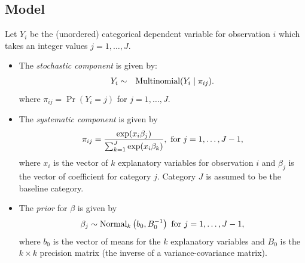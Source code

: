 \documentclass[letterpaper,10pt,english]{sphinxmanual}
\begin{document}
\subsection{Model}
\label{vignette:id86}
Let \(Y_{i}\) be the (unordered) categorical dependent variable for
observation \(i\) which takes an integer values
\(j=1, \ldots, J\).
\begin{itemize}
\item {} 
The \emph{stochastic component} is given by:
\begin{gather}
\begin{split}\begin{aligned}
Y_{i} &\sim& \textrm{Multinomial}(Y_i \mid \pi_{ij}).\end{aligned}\end{split}\notag
\end{gather}
where \(\pi_{ij}=\Pr(Y_i=j)\) for \(j=1, \ldots, J\).

\item {} 
The \emph{systematic component} is given by
\begin{gather}
\begin{split}\begin{aligned}
\pi_{ij}=\frac{\exp(x_i\beta_j)}{\sum_{k=1}^J \exp(x_i\beta_k)},
\textrm{ for } j=1,\ldots, J-1,\end{aligned}\end{split}\notag
\end{gather}
where \(x_{i}\) is the vector of \(k\) explanatory variables
for observation \(i\) and \(\beta_j\) is the vector of
coefficient for category \(j\). Category \(J\) is assumed to
be the baseline category.

\item {} 
The \emph{prior} for \(\beta\) is given by
\begin{gather}
\begin{split}\begin{aligned}
\beta_j \sim \textrm{Normal}_k\left(  b_{0},B_{0}^{-1}\right)
\textrm{ for } j = 1, \ldots, J-1,\end{aligned}\end{split}\notag
\end{gather}
where \(b_{0}\) is the vector of means for the \(k\)
explanatory variables and \(B_{0}\) is the \(k \times k\)
precision matrix (the inverse of a variance-covariance matrix).

\end{itemize}
\end{document}
